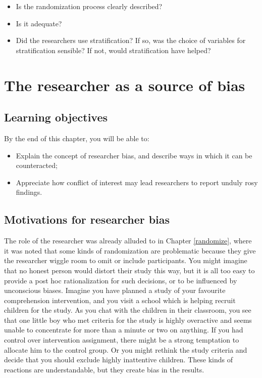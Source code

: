 \documentclass{krantz}
\begin{document}
\begin{itemize}
\item
  Is the randomization process clearly described?
\item
  Is it adequate?
\item
  Did the researchers use stratification? If so, was the choice of variables for stratification sensible? If not, would stratification have helped?
\end{itemize}

\hypertarget{experimenter}{%
\chapter{The researcher as a source of bias}\label{experimenter}}

\hypertarget{learning-objectives-7}{%
\section{Learning objectives}\label{learning-objectives-7}}

By the end of this chapter, you will be able to:

\begin{itemize}
\item
  Explain the concept of researcher bias, and describe ways in which it can be counteracted;
\item
  Appreciate how conflict of interest may lead researchers to report unduly rosy findings.
\end{itemize}

\hypertarget{motivations-for-researcher-bias}{%
\section{Motivations for researcher bias}\label{motivations-for-researcher-bias}}

The role of the researcher was already alluded to in Chapter \ref{randomize}, where it was noted that some kinds of randomization are problematic because they give the researcher wiggle room to omit or include participants. You might imagine that no honest person would distort their study this way, but it is all too easy to provide a post hoc rationalization for such decisions, or to be influenced by unconscious biases. Imagine you have planned a study of your favourite comprehension intervention, and you visit a school which is helping recruit children for the study. As you chat with the children in their classroom, you see that one little boy who met criteria for the study is highly overactive and seems unable to concentrate for more than a minute or two on anything. If you had control over intervention assignment, there might be a strong temptation to allocate him to the control group. Or you might rethink the study criteria and decide that you should exclude highly inattentive children. These kinds of reactions are understandable, but they create bias in the results.
\end{document}
